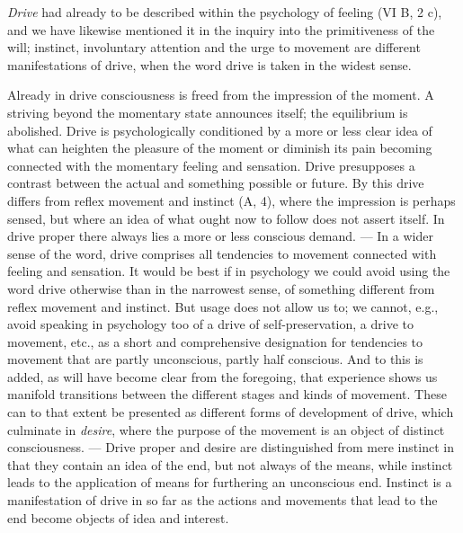 \documentclass[12pt,a4paper]{book}
\newcommand{\opage}[1]{\marginnote{\footnotesize\textit{[#1]}}}
\begin{document}
\opage{380}\emph{Drive} had already to be described within the psychology
of feeling (VI B, 2 c), and we have likewise mentioned it in the inquiry
into the primitiveness of the will; instinct, involuntary attention and
the urge to movement are different manifestations of drive, when the word
drive is taken in the widest sense.

Already in drive consciousness is freed from the impression of the
moment. A striving beyond the momentary state announces itself; the
equilibrium is abolished. Drive is psychologically conditioned by a more
or less clear idea of what can heighten the pleasure of the moment or
diminish its pain becoming connected with the momentary feeling and
sensation. Drive presupposes a contrast between the actual and something
possible or future. By this drive differs from reflex movement and
instinct (A, 4), where the impression is perhaps sensed, but where an idea
of what ought now to follow does not assert itself. In drive proper there
always lies a more or less conscious demand. --- In a wider sense of the
word, drive comprises all tendencies to movement connected with feeling
and sensation. It would be best if in psychology we could avoid using the
word drive otherwise than in the narrowest sense, of something different
from reflex movement and instinct. But usage does not allow us to; we
cannot, e.g., avoid speaking in psychology too of a drive of
self-preservation, a drive to movement, etc., as a short and
comprehensive designation for tendencies to movement that are partly
unconscious, partly half conscious. And to this is added, as will have
become clear from the foregoing, that experience shows us manifold
transitions between the different stages and kinds of movement. These
can to that extent be presented as different forms of development of
drive, which culminate in \emph{desire}, where the purpose of the movement
is an object of distinct consciousness. --- Drive proper and desire are
distinguished from mere instinct in that they contain an idea of the end,
but not always of the means, while instinct leads to the application of
means for furthering an unconscious end. Instinct is a manifestation of
drive in so far as the actions and movements that lead to the end become
objects of idea and interest.
\end{document}
